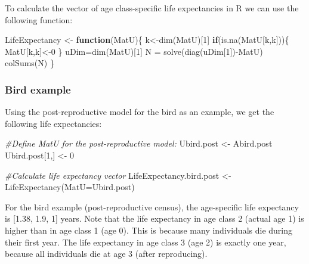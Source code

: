 \documentclass[
]{book}
\newenvironment{Shaded}{\begin{snugshade}}{\end{snugshade}}
\newcommand{\AttributeTok}[1]{\textcolor[rgb]{0.77,0.63,0.00}{#1}}
\newcommand{\CommentTok}[1]{\textcolor[rgb]{0.56,0.35,0.01}{\textit{#1}}}
\newcommand{\ControlFlowTok}[1]{\textcolor[rgb]{0.13,0.29,0.53}{\textbf{#1}}}
\newcommand{\DecValTok}[1]{\textcolor[rgb]{0.00,0.00,0.81}{#1}}
\newcommand{\FunctionTok}[1]{\textcolor[rgb]{0.00,0.00,0.00}{#1}}
\newcommand{\NormalTok}[1]{#1}
\newcommand{\OtherTok}[1]{\textcolor[rgb]{0.56,0.35,0.01}{#1}}
\newcommand{\SpecialCharTok}[1]{\textcolor[rgb]{0.00,0.00,0.00}{#1}}
\begin{document}
To calculate the vector of age class-specific life expectancies in R we can use the following function:

\begin{Shaded}
\begin{Highlighting}[]
\NormalTok{ LifeExpectancy }\OtherTok{\textless{}{-}} \ControlFlowTok{function}\NormalTok{(MatU)\{   }
\NormalTok{  k}\OtherTok{\textless{}{-}}\FunctionTok{dim}\NormalTok{(MatU)[}\DecValTok{1}\NormalTok{]}
  \ControlFlowTok{if}\NormalTok{(}\FunctionTok{is.na}\NormalTok{(MatU[k,k]))\{}
\NormalTok{    MatU[k,k]}\OtherTok{\textless{}{-}}\DecValTok{0}
\NormalTok{  \}}
\NormalTok{  uDim}\OtherTok{=}\FunctionTok{dim}\NormalTok{(MatU)[}\DecValTok{1}\NormalTok{]}
\NormalTok{  N }\OtherTok{=} \FunctionTok{solve}\NormalTok{(}\FunctionTok{diag}\NormalTok{(uDim[}\DecValTok{1}\NormalTok{])}\SpecialCharTok{{-}}\NormalTok{MatU)   }
  \FunctionTok{colSums}\NormalTok{(N)  }
\NormalTok{\}}
\end{Highlighting}
\end{Shaded}

\hypertarget{bird-example-8}{%
\subsubsection*{Bird example}\label{bird-example-8}}

Using the post-reproductive model for the bird as an example, we get the following life expectancies:

\begin{Shaded}
\begin{Highlighting}[]
\CommentTok{\#Define MatU for the post{-}reproductive model:}
\NormalTok{Ubird.post }\OtherTok{\textless{}{-}}\NormalTok{ Abird.post}
\NormalTok{Ubird.post[}\DecValTok{1}\NormalTok{,] }\OtherTok{\textless{}{-}} \DecValTok{0} 

\CommentTok{\#Calculate life expectancy vector}
\NormalTok{ LifeExpectancy.bird.post }\OtherTok{\textless{}{-}} \FunctionTok{LifeExpectancy}\NormalTok{(}\AttributeTok{MatU=}\NormalTok{Ubird.post)}
\end{Highlighting}
\end{Shaded}

For the bird example (post-reproductive census), the age-specific life expectancy is {[}1.38, 1.9, 1{]} years. Note that the life expectancy in age class 2 (actual age 1) is higher than in age class 1 (age 0). This is because many individuals die during their first year. The life expectancy in age class 3 (age 2) is exactly one year, because all individuals die at age 3 (after reproducing).
\end{document}
